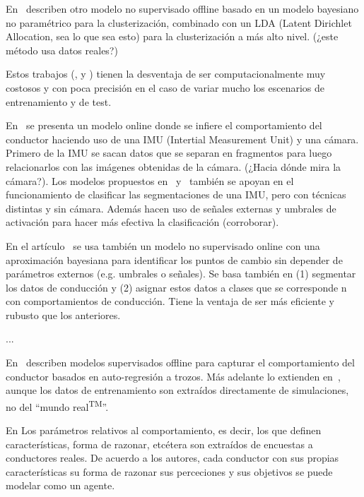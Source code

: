 En~\cite{bando2013unsupervised} describen otro modelo no supervisado offline basado en un modelo bayesiano no paramétrico para la clusterización, combinado con un LDA (Latent Dirichlet Allocation, sea lo que sea esto) para la clusterización a más alto nivel. (\TODO ¿este método usa datos reales?)

Estos trabajos (\cite{sekizawa2007modeling}, \cite{terada2010multi} y \cite{bando2013unsupervised}) tienen la desventaja de ser computacionalmente muy costosos y con poca precisión en el caso de variar mucho los escenarios de entrenamiento y de test.

En~\cite{maye2011bayesian} se presenta un modelo online donde se infiere el comportamiento del conductor haciendo uso de una IMU (Intertial Measurement Unit) y una cámara. Primero de la IMU se sacan datos que se separan en fragmentos para luego relacionarlos con las imágenes obtenidas de la cámara. (\TODO ¿Hacia dónde mira la cámara?). Los modelos propuestos en~\cite{johnson2011driving} y~\cite{van2013driver} también se apoyan en el funcionamiento de clasificar las segmentaciones de una IMU, pero con técnicas distintas y sin cámara. Además hacen uso de señales externas y umbrales de activación para hacer más efectiva la clasificación (\TODO corroborar).

En el artículo~\cite{bender2015unsupervised} se usa también un modelo no supervisado online con una aproximación bayesiana para identificar los puntos de cambio sin depender de parámetros externos (e.g. umbrales o señales). Se basa también en (1) segmentar los datos de conducción y (2) asignar estos datos a clases que se corresponde n con comportamientos de conducción. Tiene la ventaja de ser más eficiente y rubusto que los anteriores.

...

En~\cite{sekizawa2007modeling} describen modelos supervisados offline para capturar el comportamiento del conductor basados en auto-regresión a trozos. Más adelante lo extienden en~\cite{terada2010multi}, aunque los datos de entrenamiento son extraídos directamente de simulaciones, no del \enquote{mundo real\textsuperscript{TM}}.

\newthought{}

En \cite{Dia2002} Los parámetros relativos al comportamiento, es decir, los que definen características, forma de razonar, etcétera son extraídos de encuestas a conductores reales. De acuerdo a los autores, cada conductor con sus propias características su forma de razonar sus perceciones y sus objetivos se puede modelar como un agente.

